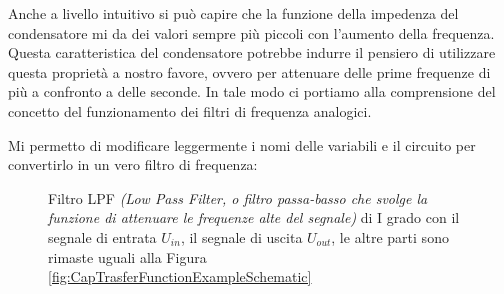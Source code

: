 \documentclass[a4paper, 10pt, final]{article} %
\begin{document}
    Anche a livello intuitivo si pu\`{o} capire che la funzione della impedenza del condensatore mi da dei valori sempre pi\`{u} piccoli con l'aumento della frequenza.
    Questa caratteristica del condensatore potrebbe indurre il pensiero di utilizzare questa propriet\`{a} a nostro favore, ovvero per attenuare delle prime frequenze di pi\`{u} a confronto a delle seconde.
    In tale modo ci portiamo alla comprensione del concetto del funzionamento dei filtri di frequenza analogici.

    Mi permetto di modificare leggermente i nomi delle variabili e il circuito per convertirlo in un vero filtro di frequenza:
    \begin{figure}[H]
        \centering
        \caption{Filtro LPF \emph{(Low Pass Filter, o filtro passa-basso che svolge la funzione di attenuare le frequenze alte del segnale)} di I grado con il segnale di entrata $U_{in}$, il segnale di uscita $U_{out}$, le altre parti sono rimaste uguali alla Figura \ref{fig:CapTrasferFunctionExampleSchematic}}
        \label{fig:CapFilterExample}
    \end{figure}
\end{document}
